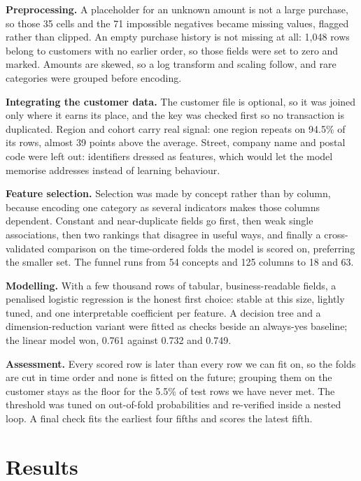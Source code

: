 \documentclass[11pt,a4paper]{article}
\newcommand{\lead}[1]{\textbf{#1.}\space}
\begin{document}
\lead{Preprocessing} A placeholder for an unknown amount is not a large purchase, so those 35 cells and the
71 impossible negatives became missing values, flagged rather than clipped. An empty purchase history is not
missing at all: 1{,}048 rows belong to customers with no earlier order, so those fields were set to zero and
marked. Amounts are skewed, so a log transform and scaling follow, and rare categories were grouped before
encoding.

\lead{Integrating the customer data} The customer file is optional, so it was joined only where it earns its
place, and the key was checked first so no transaction is duplicated. Region and cohort carry real signal: one
region repeats on 94.5\% of its rows, almost 39 points above the average. Street, company name and postal code
were left out: identifiers dressed as features, which would let the model memorise addresses instead of learning
behaviour.

\lead{Feature selection} Selection was made by concept rather than by column, because encoding one category as
several indicators makes those columns dependent. Constant and near-duplicate fields go first, then weak single
associations, then two rankings that disagree in useful ways, and finally a cross-validated comparison on the
time-ordered folds the model is scored on, preferring the smaller set. The funnel runs from 54 concepts and 125
columns to 18 and 63.

\lead{Modelling} With a few thousand rows of tabular, business-readable fields, a penalised logistic regression
is the honest first choice: stable at this size, lightly tuned, and one interpretable coefficient per feature.
A decision tree and a dimension-reduction variant were fitted as checks beside an always-yes baseline; the linear
model won, 0.761 against 0.732 and 0.749.

\lead{Assessment} Every scored row is later than every row we can fit on, so the folds are cut in time order and
none is fitted on the future; grouping them on the customer stays as the floor for the 5.5\% of test rows we have
never met. The threshold was tuned on out-of-fold probabilities and re-verified inside a nested loop. A final
check fits the earliest four fifths and scores the latest fifth.

\section{Results}
\end{document}
